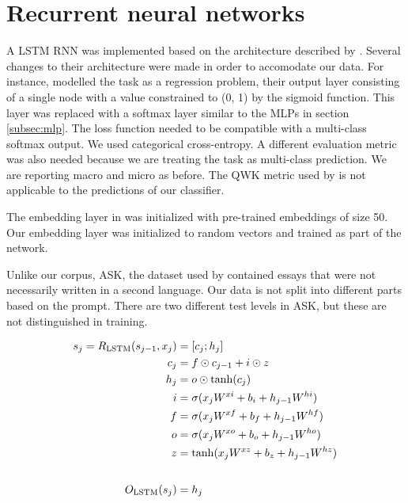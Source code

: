 \section{Recurrent neural networks}

A \ac{LSTM} \ac{RNN} was implemented based on the architecture described by
\textcite{taghipour16}. Several changes to their architecture were made in
order to accomodate our data. For instance, \citeauthor{taghipour16} modelled
the task as a regression problem, their output layer consisting of a single
node with a value constrained to (0, 1) by the sigmoid function. This layer
was replaced with a softmax layer similar to the \acp{MLP} in section
\ref{subsec:mlp}. The loss function needed to be compatible with a
multi-class softmax output. We used categorical cross-entropy. A different
evaluation metric was also needed because we are treating the task as
multi-class prediction. We are reporting macro and micro \FI as before. The
\ac{QWK} metric used by \citeauthor{taghipour16} is not applicable to the
predictions of our classifier.

The embedding layer in \textcite{taghipour16} was initialized with
pre-trained embeddings of size 50. Our embedding layer was initialized to
random vectors and trained as part of the network.

Unlike our corpus, ASK, the dataset used by \citeauthor{taghipour16}
contained essays that were not necessarily written in a second language. Our
data is not split into different parts based on the prompt. There are two
different test levels in ASK, but these are not distinguished in training.

\begin{equation}
  \begin{aligned}
  s_j = R_{\text{LSTM}}(s_{j-1}, x_j) &= [c_j;h_j] \\
                           c_j &= f \odot c_{j-1} + i \odot z \\
                           h_j &= o \odot \tanh(c_j) \\
                             i &= \sigma(x_j W^{xi} + b_i + h_{j-1} W^{hi}) \\
                             f &= \sigma(x_j W^{xf} + b_f + h_{j-1} W^{hf}) \\
                             o &= \sigma(x_j W^{xo} + b_o + h_{j-1} W^{ho}) \\
                             z &= \tanh(x_j W^{xz} + b_z + h_{j-1} W^{hz}) \\
                             \\[1\jot]
                 O_{\text{LSTM}}(s_j) &= h_j
  \end{aligned}
\end{equation}

